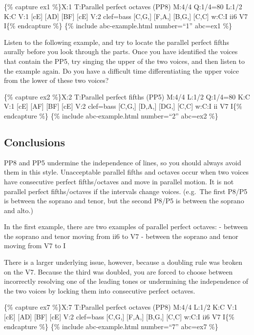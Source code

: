 \documentclass{book}
\begin{document}
\{\% capture ex1 \%\}X:1 T:Parallel perfect octaves (PP8) M:4/4 Q:1/4=80 L:1/2
K:C V:1 {[}cE{]} {[}AD{]}\textbar{} {[}BF{]} {[}cE{]}\textbar{]} V:2 clef=bass
{[}C,G,{]} {[}F,A,{]} \textbar{} {[}B,G,{]} {[}C,C{]}\textbar{]} w:C:I ii6 V7
I\{\% endcapture \%\} \{\% include abc-example.html number=``1'' abc=ex1 \%\}

Listen to the following example, and try to locate the parallel perfect fifths
aurally before you look through the parts. Once you have identified the voices
that contain the PP5, try singing the upper of the two voices, and then listen
to the example again. Do you have a difficult time differentiating the upper
voice from the lower of these two voices?

\{\% capture ex2 \%\}X:2 T:Parallel perfect fifths (PP5) M:4/4 L:1/2 Q:1/4=80
K:C V:1 {[}cE{]} {[}AF{]}\textbar{} {[}BF{]} {[}cE{]}\textbar{]} V:2 clef=bass
{[}C,G,{]} {[}D,A,{]} \textbar{} {[}DG,{]} {[}C,C{]}\textbar{]} w:C:I ii V7
I\{\% endcapture \%\} \{\% include abc-example.html number=``2'' abc=ex2 \%\}

\hypertarget{conclusions-43}{%
\subsection{Conclusions}\label{conclusions-43}}

PP8 and PP5 undermine the independence of lines, so you should always avoid
them in this style. Unacceptable parallel fifths and octaves occur when two
voices have consecutive perfect fifths/octaves and move in parallel motion. It
is not parallel perfect fifths/octaves if the intervals change voices.
(e.g.~The first P8/P5 is between the soprano and tenor, but the second P8/P5
is between the soprano and alto.)

In the first example, there are two examples of parallel perfect octaves: -
between the soprano and tenor moving from ii6 to V7 - between the soprano and
tenor moving from V7 to I

There is a larger underlying issue, however, because a doubling rule was
broken on the V7. Because the third was doubled, you are forced to choose
between incorrectly resolving one of the leading tones or undermining the
independence of the two voices by locking them into consecutive perfect
octaves.

\{\% capture ex7 \%\}X:7 T:Parallel perfect octaves (PP8) M:4/4 L:1/2 K:C V:1
{[}cE{]} {[}AD{]}\textbar{} {[}BF{]} {[}cE{]}\textbar{]} V:2 clef=bass
{[}C,G,{]} {[}F,A,{]} \textbar{} {[}B,G,{]} {[}C,C{]}\textbar{]} w:C:I ii6 V7
I\{\% endcapture \%\} \{\% include abc-example.html number=``7'' abc=ex7 \%\}
\end{document}
